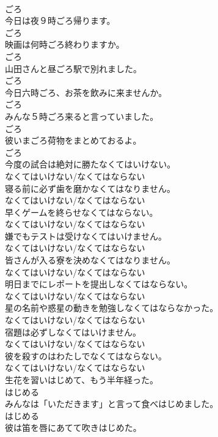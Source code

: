 \documentclass[8pt]{extreport}
\begin{document}
\begin{CJK}{UTF8}{min}
\\	ごろ
\\	今日は夜９時ごろ帰ります。	
\\	ごろ
\\	映画は何時ごろ終わりますか。	
\\	ごろ
\\	山田さんと昼ごろ駅で別れました。	
\\	ごろ
\\	今日六時ごろ、お茶を飲みに来ませんか。	
\\	ごろ
\\	みんな５時ごろ来ると言っていました。	
\\	ごろ
\\	彼いまごろ荷物をまとめておるよ。	
\\	ごろ
\\	今度の試合は絶対に勝たなくてはいけない。	
\\	なくてはいけない/なくてはならない
\\	寝る前に必ず歯を磨かなくてはなりません。	
\\	なくてはいけない/なくてはならない
\\	早くゲームを終らせなくてはならない。	
\\	なくてはいけない/なくてはならない
\\	嫌でもテストは受けなくてはいけません。	
\\	なくてはいけない/なくてはならない
\\	皆さんが入る寮を決めなくてはなりません。	
\\	なくてはいけない/なくてはならない
\\	明日までにレポートを提出しなくてはならない。	
\\	なくてはいけない/なくてはならない
\\	星の名前や惑星の動きを勉強しなくてはならなかった。	
\\	なくてはいけない/なくてはならない
\\	宿題は必ずしなくてはいけません。	
\\	なくてはいけない/なくてはならない
\\	彼を殺すのはわたしでなくてはならない。	
\\	なくてはいけない/なくてはならない
\\	生花を習いはじめて、もう半年経った。	
\\	はじめる
\\	みんなは「いただきます」と言って食べはじめました。	
\\	はじめる
\\	彼は笛を唇にあてて吹きはじめた。	

\end{CJK}
\end{document}
